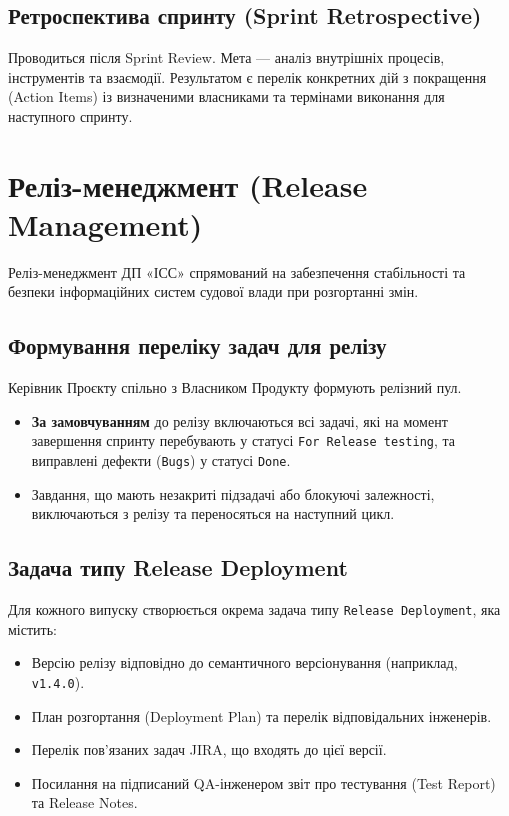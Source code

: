 \documentclass{article}
\begin{document}
\subsection{Ретроспектива спринту (Sprint Retrospective)}
Проводиться після Sprint Review. Мета --- аналіз внутрішніх процесів, інструментів та взаємодії. Результатом є перелік конкретних дій з покращення (Action Items) із визначеними власниками та термінами виконання для наступного спринту.

\section{Реліз-менеджмент (Release Management)}

Реліз-менеджмент ДП «ІСС» спрямований на забезпечення стабільності та безпеки інформаційних систем судової влади при розгортанні змін.

\subsection{Формування переліку задач для релізу}
Керівник Проєкту спільно з Власником Продукту формують релізний пул. 
\begin{itemize}
    \item \textbf{За замовчуванням} до релізу включаються всі задачі, які на момент завершення спринту перебувають у статусі \texttt{For Release testing}, та виправлені дефекти (\texttt{Bugs}) у статусі \texttt{Done}.
    \item Завдання, що мають незакриті підзадачі або блокуючі залежності, виключаються з релізу та переносяться на наступний цикл.
\end{itemize}

\subsection{Задача типу Release Deployment}
Для кожного випуску створюється окрема задача типу \texttt{Release Deployment}, яка містить:
\begin{itemize}
    \item Версію релізу відповідно до семантичного версіонування (наприклад, \texttt{v1.4.0}).
    \item План розгортання (Deployment Plan) та перелік відповідальних інженерів.
    \item Перелік пов'язаних задач JIRA, що входять до цієї версії.
    \item Посилання на підписаний QA-інженером звіт про тестування (Test Report) та Release Notes.
\end{itemize}
\end{document}
